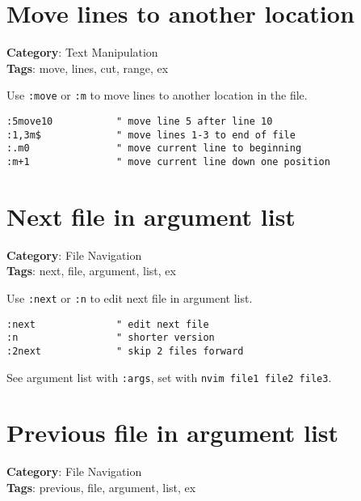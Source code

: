 {{{{{{\section{Move lines to another location}

\textbf{Category}: Text Manipulation\\ \textbf{Tags}: move, lines, cut, range, ex
\vspace{0.5cm}

Use {\footnotesize \Verb§:move§} or {\footnotesize \Verb§:m§} to move lines to another location in the file.

\begin{Exa*}{}
\begin{Verbatim}[fontsize=\footnotesize, breaklines, breakanywhere]
:5move10           " move line 5 after line 10
:1,3m$             " move lines 1-3 to end of file
:.m0               " move current line to beginning
:m+1               " move current line down one position
\end{Verbatim}
\end{Exa*}

\section{Next file in argument list}

\textbf{Category}: File Navigation\\ \textbf{Tags}: next, file, argument, list, ex
\vspace{0.5cm}

Use {\footnotesize \Verb§:next§} or {\footnotesize \Verb§:n§} to edit next file in argument list.

\begin{Exa*}{}
\begin{Verbatim}[fontsize=\footnotesize, breaklines, breakanywhere]
:next              " edit next file
:n                 " shorter version
:2next             " skip 2 files forward
\end{Verbatim}
\end{Exa*}

See argument list with {\footnotesize \Verb§:args§}, set with {\footnotesize \Verb§nvim file1 file2 file3§}.

\section{Previous file in argument list}

\textbf{Category}: File Navigation\\ \textbf{Tags}: previous, file, argument, list, ex
\vspace{0.5cm}

}}}}}}
